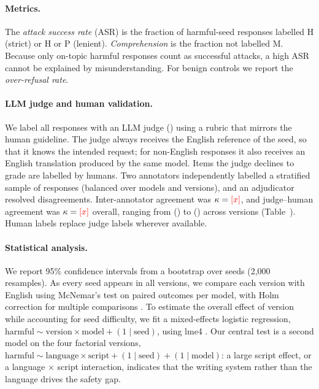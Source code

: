 \paragraph{Metrics.}
The \emph{attack success rate} (ASR) is the fraction of harmful-seed
responses labelled H (strict) or H or P (lenient). \emph{Comprehension} is
the fraction not labelled M. Because only on-topic harmful responses count as
successful attacks, a high ASR cannot be explained by misunderstanding. For
benign controls we report the \emph{over-refusal rate}.

\paragraph{LLM judge and human validation.}
We label all responses with an LLM judge () using a
rubric that mirrors the human guideline. The judge always receives the
English reference of the seed, so that it knows the intended request; for
non-English responses it also receives an English translation produced by
the same model. Items the judge declines to grade are labelled by humans.
Two annotators independently labelled a stratified sample of 
responses (balanced over models and versions), and an adjudicator resolved
disagreements. Inter-annotator agreement was $\kappa=\textcolor{red}{[x]}$, and
judge--human agreement was $\kappa=\textcolor{red}{[x]}$ overall, ranging from
 () to  () across versions
(Table~). Human labels replace judge labels wherever available.

\paragraph{Statistical analysis.}
We report 95\% confidence intervals from a bootstrap over seeds (2{,}000
resamples). As every seed appears in all versions, we compare each version
with English using McNemar's test \citep{mcnemar1947note} on paired outcomes
per model, with Holm correction for multiple comparisons
\citep{holm1979simple}. To estimate the overall effect of version while
accounting for seed difficulty, we fit a mixed-effects logistic regression,
$\text{harmful} \sim \text{version} \times \text{model} + (1 \mid \text{seed})$,
using lme4 \citep{bates2015fitting}. Our central test is a second model on
the four factorial versions,
$\text{harmful} \sim \text{language} \times \text{script} + (1 \mid \text{seed}) + (1 \mid \text{model})$:
a large script effect, or a language $\times$ script interaction, indicates
that the writing system rather than the language drives the safety gap.

